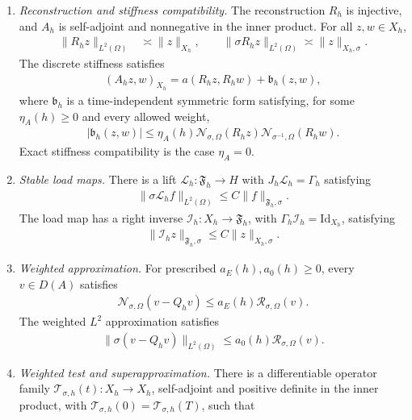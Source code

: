 \documentclass[print,wide,eng]{draft}
\begin{document}
\begin{enumerate}[label=\textbf{(N\arabic*)},ref=(N\arabic*)]
\item\label{ass:interfaces} \emph{Reconstruction and stiffness compatibility.} The reconstruction $R_h$ is injective, and $A_h$ is self-adjoint and nonnegative in the inner product. For all $z,w\in X_h$,
\begin{align}\label{eq:reconstruction-norms}
\|R_hz\|_{L^2(\Omega)}&\asymp\|z\|_{X_h},\qquad
\|\sigma R_hz\|_{L^2(\Omega)}\asymp\|z\|_{X_h,\sigma}.
\end{align}
The discrete stiffness satisfies
\begin{align}\label{eq:stiffnessinterface}
(A_hz,w)_{X_h}=a(R_hz,R_hw)+\mathfrak b_h(z,w),
\end{align}
where $\mathfrak b_h$ is a time-independent symmetric form satisfying, for some $\eta_A(h)\geq0$ and every allowed weight,
\begin{align}\label{eq:stiffnessdefect}
|\mathfrak b_h(z,w)|\leq\eta_A(h)
\mathcal N_{\sigma,\Omega}(R_hz)\mathcal N_{\sigma^{-1},\Omega}(R_hw).
\end{align}
Exact stiffness compatibility is the case $\eta_A=0$.
\item\label{ass:loads} \emph{Stable load maps.} There is a lift $\mathcal L_h:\mathfrak F_h\to H$ with $J_h\mathcal L_h=\Gamma_h$ satisfying
\begin{align}\label{eq:loadinterface}
\|\sigma\mathcal L_hf\|_{L^2(\Omega)}\leq C\|f\|_{\mathfrak F_h,\sigma}.
\end{align}
The load map has a right inverse $\mathcal I_h:X_h\to\mathfrak F_h$, with $\Gamma_h\mathcal I_h=\mathrm{Id}_{X_h}$, satisfying
\begin{align}\label{eq:stateload}
\|\mathcal I_hz\|_{\mathfrak F_h,\sigma}\leq C\|z\|_{X_h,\sigma}.
\end{align}
\item\label{Papprox} \emph{Weighted approximation.} For prescribed $a_E(h),a_0(h)\geq0$, every $v\in D(A)$ satisfies
\begin{align}\label{eq:approximation}
\mathcal N_{\sigma,\Omega}(v-Q_hv)\leq a_E(h)\mathcal R_{\sigma,\Omega}(v).
\end{align}
The weighted $L^2$ approximation satisfies
\begin{align}\label{eq:approximation-l2}
\|\sigma(v-Q_hv)\|_{L^2(\Omega)}\leq a_0(h)\mathcal R_{\sigma,\Omega}(v).
\end{align}
\item\label{Ptest} \emph{Weighted test and superapproximation.} There is a differentiable operator family $\mathscr{T}_{\sigma,h}(t):X_h\to X_h$, self-adjoint and positive definite in the inner product, with $\mathscr{T}_{\sigma,h}(0)=\mathscr{T}_{\sigma,h}(T)$, such that

\end{enumerate}
\end{document}

